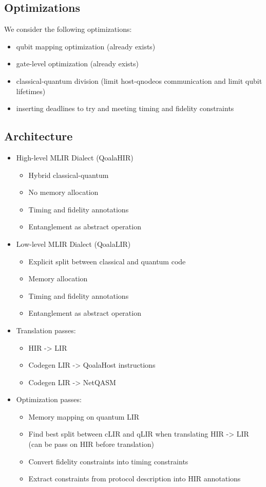 \subsection{Optimizations}
We consider the following optimizations:
\begin{itemize}
\item qubit mapping optimization (already exists)
\item gate-level optimization (already exists)
\item classical-quantum division (limit host-qnodeos communication and limit qubit lifetimes)
\item inserting deadlines to try and meeting timing and fidelity constraints
\end{itemize}


\subsection{Architecture}


\begin{itemize}
\item High-level MLIR Dialect (QoalaHIR)
    \begin{itemize}
        \item Hybrid classical-quantum
        \item No memory allocation
        \item Timing and fidelity annotations
        \item Entanglement as abstract operation
    \end{itemize}
\item Low-level MLIR Dialect (QoalaLIR)
    \begin{itemize}
        \item Explicit split between classical and quantum code
        \item Memory allocation
        \item Timing and fidelity annotations
        \item Entanglement as abstract operation
    \end{itemize}
\item Translation passes:
    \begin{itemize}
        \item HIR -> LIR
        \item Codegen LIR -> QoalaHost instructions
        \item Codegen LIR -> NetQASM
    \end{itemize}
\item Optimization passes:
    \begin{itemize}
        \item Memory mapping on quantum LIR
        \item Find best split between cLIR and qLIR when translating HIR -> LIR (can be pass on HIR before translation)
        \item Convert fidelity constraints into timing constraints
        \item Extract constraints from protocol description into HIR annotations
    \end{itemize}
\end{itemize}

